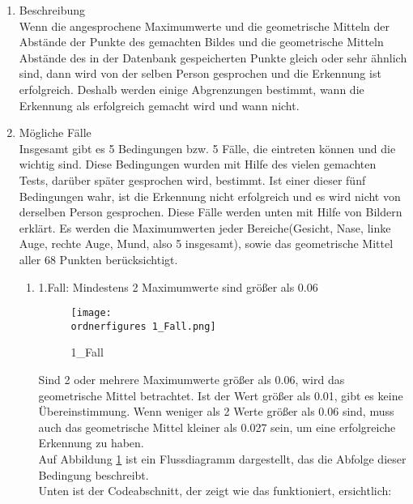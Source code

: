 \begin{enumerate}
\begin{itemize}
	\begin{enumerate}
		\item Beschreibung \\
		
		Wenn die angesprochene Maximumwerte und die geometrische Mitteln der Abstände der Punkte des gemachten Bildes und die geometrische Mitteln Abstände des in der Datenbank gespeicherten Punkte gleich oder sehr ähnlich sind, dann wird von der selben Person gesprochen und die Erkennung ist erfolgreich. Deshalb werden einige Abgrenzungen bestimmt, wann die Erkennung als erfolgreich gemacht wird und wann nicht.
		
		\item Mögliche Fälle \\
		
		Insgesamt gibt es 5 Bedingungen bzw. 5 Fälle, die eintreten können und die wichtig sind. Diese Bedingungen wurden mit Hilfe des vielen gemachten Tests, darüber später gesprochen wird, bestimmt. Ist einer dieser fünf Bedingungen wahr, ist die Erkennung nicht erfolgreich und es wird nicht von derselben Person gesprochen. Diese Fälle werden unten mit Hilfe von Bildern erklärt. Es werden die Maximumwerten jeder Bereiche(Gesicht, Nase, linke Auge, rechte Auge, Mund, also 5 insgesamt), sowie das geometrische Mittel aller 68 Punkten berücksichtigt.
		
		\begin{enumerate}
			\item 1.Fall: Mindestens 2 Maximumwerte sind größer als 0.06 \\
			
				\begin{figure}[H]
				\centering
				\texttt{[image: \\ordnerfigures 1\_Fall.png]}
				\caption{1\_Fall}
				\label{fig:1_Fall}
			\end{figure}
			
			Sind 2 oder mehrere Maximumwerte größer als 0.06, wird das geometrische Mittel betrachtet. Ist der Wert größer als 0.01, gibt es keine Übereinstimmung. Wenn weniger als 2 Werte größer als 0.06 sind, muss auch das geometrische Mittel kleiner als 0.027 sein, um eine erfolgreiche Erkennung zu haben. \\
			
			Auf Abbildung \ref{fig:1_Fall} ist ein Flussdiagramm dargestellt, das die Abfolge dieser Bedingung beschreibt.\\
			
			Unten ist der Codeabschnitt, der zeigt wie das funktioniert, ersichtlich:\\
			

\end{enumerate}
\end{enumerate}
\end{itemize}
\end{enumerate}

